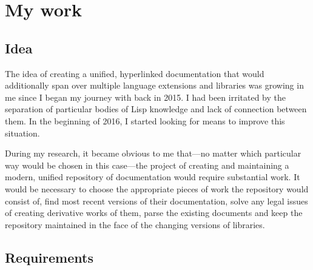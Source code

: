 \section{My work}

\subsection{Idea}

The idea of creating a unified, hyperlinked \cl{} documentation that would additionally span over multiple language extensions and libraries was growing in me since I began my journey with \cl{} back in 2015. I had been irritated by the separation of particular bodies of Lisp knowledge and lack of connection between them. In the beginning of 2016, I started looking for means to improve this situation.

During my research, it became obvious to me that---no matter which particular way would be chosen in this case---the project of creating and maintaining a modern, unified repository of \cl{} documentation would require substantial work. It would be necessary to choose the appropriate pieces of work the repository would consist of, find most recent versions of their documentation, solve any legal issues of creating derivative works of them, parse the existing documents and keep the repository maintained in the face of the changing versions of \cl{} libraries.

\subsection{Requirements} \label{requirements}

